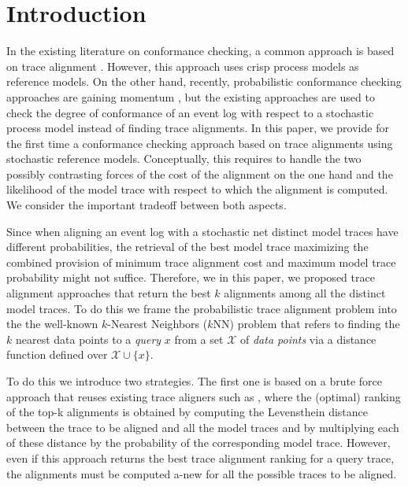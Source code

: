 
\section{Introduction}
\label{introduction}


In the existing literature on conformance checking, a common approach is based on trace alignment \cite{DBLP:conf/edoc/AdriansyahDA11}. However, this approach uses crisp process models as reference models. On the other hand, recently, probabilistic conformance checking approaches are gaining momentum \cite{DBLP:conf/bpm/LeemansSA19,DBLP:conf/icpm/PolyvyanyyK19,DBLP:journals/tosem/PolyvyanyySWCM20}, but
the existing approaches are used to check the degree of conformance of an event log with respect to a stochastic process model
instead of finding trace alignments.
In this paper, we provide for the first time a conformance checking approach based on trace alignments using stochastic reference
models. Conceptually, this requires to handle the two possibly contrasting forces of the cost of the alignment on the one hand and the
likelihood of the model trace with respect to which the alignment is computed. We consider the important tradeoff between both
aspects.



Since when aligning an event log with a stochastic net distinct model traces have different probabilities, the retrieval of the best model trace maximizing the combined provision of minimum trace alignment cost and maximum model trace probability might not suffice. Therefore, we in this paper, we proposed trace alignment approaches that return the best $k$ alignments among all the distinct model traces. To do this we frame the probabilistic trace alignment problem into the the well-known $k$-Nearest Neighbors ($k$NN) problem \cite{Altman} that refers to finding the $k$ nearest data points to a \textit{query} $x$ from a set $\mathcal{X}$ of \textit{data points} via a distance function defined over $\mathcal{X}\cup\{x\}$.

To do this we introduce two strategies. The first one is based on a brute force approach that reuses existing trace aligners such as \cite{DBLP:conf/edoc/AdriansyahDA11,LeoniM17}, where the (optimal) ranking of the top-k alignments is obtained by computing the Levensthein distance between the trace to be aligned and all the model traces and by multiplying each of these distance by the probability of the corresponding model trace. However, even if this approach returns the best trace alignment ranking for a query trace, the alignments must be computed a-new for all the possible traces to be aligned.

